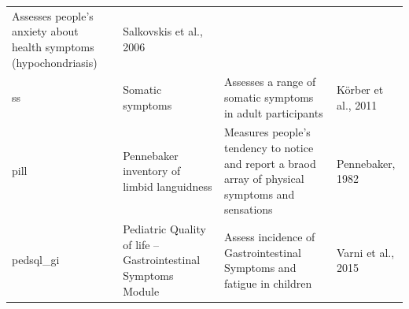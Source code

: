 \documentclass[]{book}
\begin{document}
\begin{longtable}[]{@{}llll@{}}
\begin{minipage}[t]{0.22\columnwidth}
Assesses people's anxiety about health symptoms (hypochondriasis)\strut
\end{minipage} & \begin{minipage}[t]{0.18\columnwidth}\raggedright
Salkovskis et al., 2006\strut
\end{minipage}\tabularnewline
\begin{minipage}[t]{0.22\columnwidth}\raggedright
ss\strut
\end{minipage} & \begin{minipage}[t]{0.27\columnwidth}\raggedright
Somatic symptoms\strut
\end{minipage} & \begin{minipage}[t]{0.22\columnwidth}\raggedright
Assesses a range of somatic symptoms in adult participants\strut
\end{minipage} & \begin{minipage}[t]{0.18\columnwidth}\raggedright
Körber et al., 2011\strut
\end{minipage}\tabularnewline
\begin{minipage}[t]{0.22\columnwidth}\raggedright
pill\strut
\end{minipage} & \begin{minipage}[t]{0.27\columnwidth}\raggedright
Pennebaker inventory of limbid languidness\strut
\end{minipage} & \begin{minipage}[t]{0.22\columnwidth}\raggedright
Measures people's tendency to notice and report a braod array of physical symptoms and sensations\strut
\end{minipage} & \begin{minipage}[t]{0.18\columnwidth}\raggedright
Pennebaker, 1982\strut
\end{minipage}\tabularnewline
\begin{minipage}[t]{0.22\columnwidth}\raggedright
pedsql\_gi\strut
\end{minipage} & \begin{minipage}[t]{0.27\columnwidth}\raggedright
Pediatric Quality of life -- Gastrointestinal Symptoms Module\strut
\end{minipage} & \begin{minipage}[t]{0.22\columnwidth}\raggedright
Assess incidence of Gastrointestinal Symptoms and fatigue in children\strut
\end{minipage} & \begin{minipage}[t]{0.18\columnwidth}\raggedright
Varni et al., 2015\strut
\end{minipage}\tabularnewline

\end{longtable}
\end{document}
